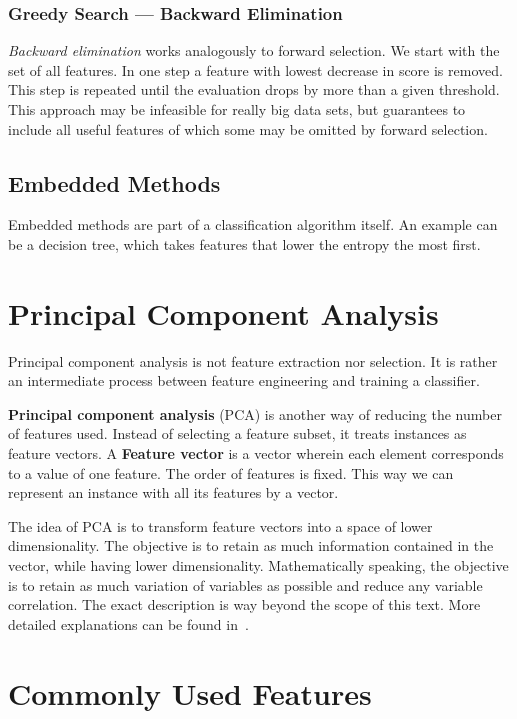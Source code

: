 \subsubsection{Greedy Search --- Backward Elimination}

{\it Backward elimination} works analogously to forward selection.
We start with the set of all features.
In one step a feature with lowest decrease in score is removed.
This step is repeated until the evaluation drops by more than a given threshold.
This approach may be infeasible for really big data sets, but guarantees to include all useful features of which some may be omitted by forward selection.

\subsection{Embedded Methods}

Embedded methods are part of a classification algorithm itself.
An example can be a decision tree, which takes features that lower the entropy the most first.

\section{Principal Component Analysis}

Principal component analysis is not feature extraction nor selection.
It is rather an intermediate process between feature engineering and training a classifier.

\textbf{Principal component analysis} (PCA) is another way of reducing the number of features used.
Instead of selecting a feature subset, it treats instances as feature vectors.
A \textbf{Feature vector} is a vector wherein each element corresponds to a value of one feature.
The order of features is fixed.
This way we can represent an instance with all its features by a vector.

The idea of PCA is to transform feature vectors into a space of lower dimensionality.
The objective is to retain as much information contained in the vector, while
having lower dimensionality.
Mathematically speaking, the objective is to retain as much variation of variables
as possible and reduce any variable correlation.
The exact description is way beyond the scope of this text.
More detailed explanations can be found in~\citet{Jolliffe02}.

\section{Commonly Used Features}

